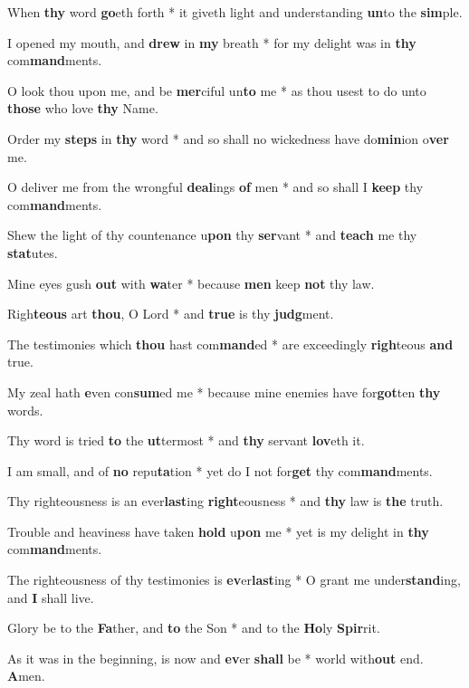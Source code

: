 \begin{multicols}{2}
	When \textbf{thy} word \textbf{go}eth forth * it giveth light and understanding \textbf{un}to the \textbf{sim}ple.
	
	I opened my mouth, and \textbf{drew} in \textbf{my} breath * for my delight was in \textbf{thy} com\textbf{mand}ments.
	
	O look thou upon me, and be \textbf{mer}ciful un\textbf{to} me * as thou usest to do unto \textbf{those} who love \textbf{thy} Name.
	
	Order my \textbf{steps} in \textbf{thy} word * and so shall no wickedness have do\textbf{min}ion o\textbf{ver} me.
	
	O deliver me from the wrongful \textbf{deal}ings \textbf{of} men * and so shall I \textbf{keep} thy com\textbf{mand}ments.
	
	Shew the light of thy countenance u\textbf{pon} thy \textbf{ser}vant * and \textbf{teach} me thy \textbf{stat}utes.
	
	Mine eyes gush \textbf{out} with \textbf{wa}ter * because \textbf{men} keep \textbf{not} thy law.
	
	Righ\textbf{teous} art \textbf{thou}, O Lord * and \textbf{true} is thy \textbf{judg}ment.
	
	The testimonies which \textbf{thou} hast com\textbf{mand}ed * are exceedingly \textbf{righ}teous \textbf{and} true.
	
	My zeal hath \textbf{e}ven con\textbf{sum}ed me * because mine enemies have for\textbf{got}ten \textbf{thy} words.
	
	Thy word is tried \textbf{to} the \textbf{ut}termost * and \textbf{thy} servant \textbf{lov}eth it.
	
	I am small, and of \textbf{no} repu\textbf{ta}tion * yet do I not for\textbf{get} thy com\textbf{mand}ments.
	
	Thy righteousness is an ever\textbf{last}ing \textbf{right}eousness * and \textbf{thy} law is \textbf{the} truth.
	
	Trouble and heaviness have taken \textbf{hold} u\textbf{pon} me * yet is my delight in \textbf{thy} com\textbf{mand}ments.
	
	The righteousness of thy testimonies is \textbf{ev}er\textbf{last}ing * O grant me under\textbf{stand}ing, and \textbf{I} shall live.
	
	Glory be to the \textbf{Fa}ther, and \textbf{to} the Son * and to the \textbf{Ho}ly \textbf{Spir}rit.
	
	As it was in the beginning, is now and \textbf{ev}er \textbf{shall} be * world with\textbf{out} end. \textbf{A}men.
\end{multicols}